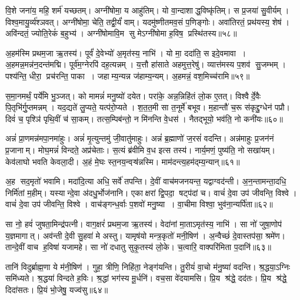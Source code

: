 वि॒शे जना॑य॒ महि॒ शर्म॑ यच्छतम्।
अग्नी॑षोमा॒ य आहु॑तिम्।
यो वा॒न्दाशाद्ध॒विष्कृ॑तिम्।
स प्र॒जया॑ सु॒वीर्यम्।
विश्व॒मायु॒र्व्य॑श्ञवत्।
अग्नी॑षोमा॒ चेति॒ तद्वी॒र्यं॑ वाम्।
यदमु॑ष्णीतमव॒सं प॒णिङ्गोः।
अवा॑तिरतं॒ प्रथ॑यस्य॒ शेष॑।
अवि॑न्दतं॒ ज्योति॒रेकं॑ ब॒हुभ्य॑।
अग्नी॑षोमावि॒म सु मेऽग्नी॑षोमा ह॒विष॒ प्रस्थि॑तस्य॥५८॥\anuvakamend[ज॒भा॒र॒ द्यौर॒ग्नेरु॒पस्थ॑ उप॒क्ष्यन्तो॑ बद्बधा॒नो व॒ध्वा॑ याद॑मानः समु॒द्रेऽह॑स॒ प्रस्थि॑तस्य]

अ॒हम॑स्मि प्रथम॒जा ऋ॒तस्य॑।
पूर्वं॑ दे॒वेभ्यो॑ अ॒मृत॑स्य॒ नाभि॑।
यो मा॒ ददा॑ति॒ स इदे॒वमावा।
अ॒हमन्न॒मन्न॑न॒दन्त॑मद्मि।
पूर्व॑म॒ग्नेरपि॑ दह॒त्यन्नम्।
य॒त्तौ हा॑साते अहमुत्त॒रेषु॑।
व्यात्त॑मस्य प॒शव॑ सु॒जम्भम्।
पश्य॑न्ति॒ धीरा॒ प्रच॑रन्ति॒ पाका।
जहाम्य॒न्यन्न ज॑हाम्य॒न्यम्।
अ॒हमन्नं॒ वश॒मिच्च॑रामि॥५९॥

स॒मा॒नमर्थं॒ पर्ये॑मि भु॒ञ्जत्।
को मामन्नं॑ मनु॒ष्यो॑ दयेत।
परा॑के॒ अन्न॒न्निहि॑तं लो॒क ए॒तत्।
विश्वैर्दे॒वैः पि॒तृभि॑र्गु॒प्तमन्नम्।
यद॒द्यते॑ लु॒प्यते॒ यत्प॑रो॒प्यते।
श॒त॒त॒मी सा त॒नूर्मे॑ बभूव।
म॒हान्तौ॑ च॒रू स॑कृद्दु॒ग्धेन॑ पप्रौ।
दिवं॑ च॒ पृश्ञि॑ पृथि॒वीं च॑ सा॒कम्।
तत्स॒म्पिब॑न्तो॒ न मि॑नन्ति वे॒धस॑।
नैतद्भूयो॒ भव॑ति॒ नो कनी॑यः॥६०॥

अन्नं॑ प्रा॒णमन्न॑मपा॒नमा॑हुः।
अन्नं॑ मृ॒त्युन्तमु॑ जी॒वातु॑माहुः।
अन्नं॑ ब्र॒ह्माणो॑ ज॒रसं॑  वदन्ति।
अन्न॑माहुः प्र॒जन॑नं प्र॒जानाम्।
मोघ॒मन्नं॑ विन्दते॒ अप्र॑चेताः।
स॒त्यं ब्र॑वीमि व॒ध इत्स तस्य॑।
नार्य॒मणं॒ पुष्य॑ति॒ नो सखा॑यम्।
केव॑लाघो भवति केवला॒दी।
अ॒हं मे॒घः स्त॒नय॒न्वऱ़्ष॑न्नस्मि।
माम॑दन्त्य॒हम॑द्म्य॒न्यान्॥६१॥

अ॒ह सद॒मृतो॑ भवामि।
मदा॑दि॒त्या अधि॒ सर्वे॑ तपन्ति।
दे॒वीं वाच॑मजनयन्त॒ यद्वाग्वद॑न्ती।
अ॒न॒न्तामन्ता॒दधि॒ निर्मि॑तां म॒हीम्।
यस्यान्दे॒वा अ॑दधु॒र्भोज॑नानि।
एकाक्षरां द्वि॒पदा॒ षट्प॑दां च।
वाचं॑ दे॒वा उप॑ जीवन्ति॒ विश्वे।
वाचं॑ दे॒वा उप॑ जीवन्ति॒ विश्वे।
वाच॑ङ्गन्ध॒र्वाः प॒शवो॑ मनु॒ष्या।
वा॒चीमा विश्वा॒ भुव॑ना॒न्यर्पि॑ता॥६२॥

सा नो॒ हवं॑ जुषता॒मिन्द्र॑पत्नी।
वाग॒क्षरं॑ प्रथम॒जा ऋ॒तस्य॑।
वेदा॑नां मा॒ताऽमृत॑स्य॒ नाभि॑।
सा नो॑ जुषा॒णोप॑ य॒ज्ञमागात्।
अव॑न्ती दे॒वी सु॒हवा॑ मे अस्तु।
यामृष॑यो मन्त्र॒कृतो॑ मनी॒षिण॑।
अ॒न्वैच्छं॑ दे॒वास्तप॑सा॒ श्रमे॑ण।
तान्दे॒वीं वाच ह॒विषा॑ यजामहे।
सा नो॑ दधातु सुकृ॒तस्य॑ लो॒के।
च॒त्वारि॒ वाक्परि॑मिता प॒दानि॑॥६३॥

तानि॑ विदुर्ब्राह्म॒णा ये म॑नी॒षिण॑।
गुहा॒ त्रीणि॒ निहि॑ता॒ नेङ्ग॑यन्ति।
तु॒रीयं॑ वा॒चो म॑नु॒ष्या॑ वदन्ति।
श्र॒द्धया॒ऽग्निः समि॑ध्यते।
श्र॒द्धया॑ विन्दते ह॒विः।
श्र॒द्धां भग॑स्य मू॒र्धनि॑।
वच॒सा वे॑दयामसि।
प्रि॒य श्र॑द्धे॒ दद॑तः।
प्रि॒य श्र॑द्धे॒ दिदा॑सतः।
प्रि॒यं भो॒जेषु॒ यज्व॑सु॥६४॥

